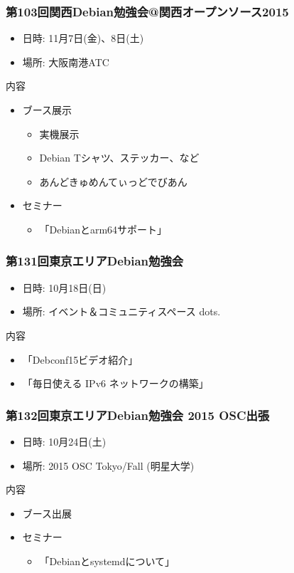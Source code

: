 \documentclass[cjk,dvipdfmx,10pt,compress,%
hyperref={bookmarks=true,bookmarksnumbered=true,bookmarksopen=false,%
colorlinks=false,%
pdftitle={第 104 回 関西 Debian 勉強会},%
pdfauthor={倉敷・のがた・佐々木・かわだ},%
pdfsubject={資料},%
}]{beamer}
\begin{document}
\begin{frame}[fragile]
  \frametitle{第103回関西Debian勉強会@関西オープンソース2015}
  \begin{itemize}
  \item 日時: 11月7日(金)、8日(土)
  \item 場所: 大阪南港ATC
  \end{itemize}
  \begin{block}{内容}
    \begin{itemize}
    \item ブース展示
      \begin{itemize}
      \item 実機展示
      \item Debian Tシャツ、ステッカー、など
      \item あんどきゅめんてぃっどでびあん
      \end{itemize}
    \item セミナー
      \begin{itemize}
      \item 「Debianとarm64サポート」
      \end{itemize}
    \end{itemize}
  \end{block}
\end{frame}

\begin{frame}[fragile]
  \frametitle{第131回東京エリアDebian勉強会}
  \begin{itemize}
  \item 日時: 10月18日(日)
  \item 場所: イベント＆コミュニティスペース dots.
  \end{itemize}
  \begin{block}{内容}
    \begin{itemize}
    \item 「Debconf15ビデオ紹介」
    \item 「毎日使える IPv6 ネットワークの構築」
    \end{itemize}
  \end{block}
\end{frame}

\begin{frame}[fragile]
  \frametitle{第132回東京エリアDebian勉強会 2015 OSC出張}
  \begin{itemize}
  \item 日時: 10月24日(土)
  \item 場所: 2015 OSC Tokyo/Fall (明星大学)
  \end{itemize}
  \begin{block}{内容}
    \begin{itemize}
    \item ブース出展
    \item セミナー
      \begin{itemize}
      \item 「Debianとsystemdについて」
      \end{itemize}
    \end{itemize}
  \end{block}
\end{frame}
\end{document}
